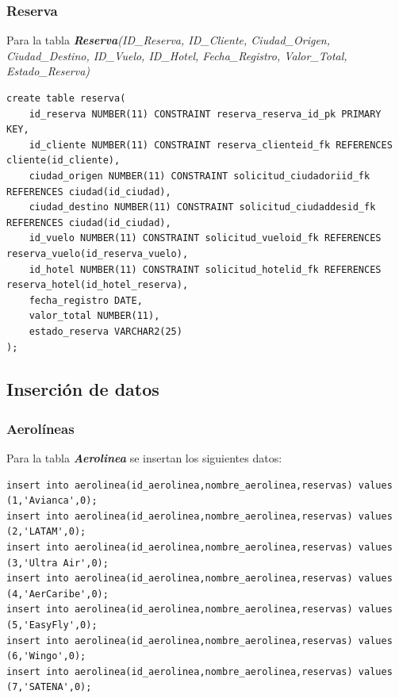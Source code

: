 \documentclass{article}
\begin{document}
\subsubsection{Reserva}\label{sec:2}

Para la tabla \textit{\textbf{Reserva}(ID\_Reserva, ID\_Cliente, Ciudad\_Origen, Ciudad\_Destino, ID\_Vuelo, ID\_Hotel, Fecha\_Registro, Valor\_Total, Estado\_Reserva)}

\begin{lstlisting}
create table reserva(
    id_reserva NUMBER(11) CONSTRAINT reserva_reserva_id_pk PRIMARY KEY,
    id_cliente NUMBER(11) CONSTRAINT reserva_clienteid_fk REFERENCES cliente(id_cliente),
    ciudad_origen NUMBER(11) CONSTRAINT solicitud_ciudadoriid_fk REFERENCES ciudad(id_ciudad),
    ciudad_destino NUMBER(11) CONSTRAINT solicitud_ciudaddesid_fk REFERENCES ciudad(id_ciudad),
    id_vuelo NUMBER(11) CONSTRAINT solicitud_vueloid_fk REFERENCES reserva_vuelo(id_reserva_vuelo),
    id_hotel NUMBER(11) CONSTRAINT solicitud_hotelid_fk REFERENCES reserva_hotel(id_hotel_reserva),
    fecha_registro DATE,
    valor_total NUMBER(11),
    estado_reserva VARCHAR2(25)
);
\end{lstlisting}



\subsection{Inserción de datos}

\subsubsection{Aerolíneas}

Para la tabla \textit{\textbf{Aerolinea}} se insertan los siguientes datos:

\begin{lstlisting}
insert into aerolinea(id_aerolinea,nombre_aerolinea,reservas) values (1,'Avianca',0);
insert into aerolinea(id_aerolinea,nombre_aerolinea,reservas) values (2,'LATAM',0);
insert into aerolinea(id_aerolinea,nombre_aerolinea,reservas) values (3,'Ultra Air',0);
insert into aerolinea(id_aerolinea,nombre_aerolinea,reservas) values (4,'AerCaribe',0);
insert into aerolinea(id_aerolinea,nombre_aerolinea,reservas) values (5,'EasyFly',0);
insert into aerolinea(id_aerolinea,nombre_aerolinea,reservas) values (6,'Wingo',0);
insert into aerolinea(id_aerolinea,nombre_aerolinea,reservas) values (7,'SATENA',0);
\end{lstlisting}
\end{document}
